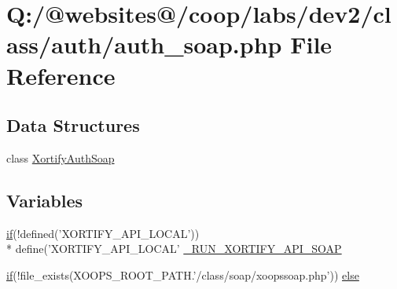 \hypertarget{auth__soap_8php}{\section{Q\-:/@websites@/coop/labs/dev2/class/auth/auth\-\_\-soap.php File Reference}
\label{auth__soap_8php}
}
\subsection*{Data Structures}
\begin{DoxyCompactItemize}
\item 
class \hyperlink{class_xortify_auth_soap}{Xortify\-Auth\-Soap}
\end{DoxyCompactItemize}
\subsection*{Variables}
\begin{DoxyCompactItemize}
\item 
\hyperlink{index_8php_ae2ccdf355624402b65fc2226f2a661cd}{if}(!defined('X\-O\-R\-T\-I\-F\-Y\-\_\-\-A\-P\-I\-\_\-\-L\-O\-C\-A\-L')) \\*
define('X\-O\-R\-T\-I\-F\-Y\-\_\-\-A\-P\-I\-\_\-\-L\-O\-C\-A\-L' \hyperlink{auth__soap_8php_a07583d496751dd9a708941cbd134b611}{\-\_\-\-R\-U\-N\-\_\-\-X\-O\-R\-T\-I\-F\-Y\-\_\-\-A\-P\-I\-\_\-\-S\-O\-A\-P}
\item 
\hyperlink{index_8php_ae2ccdf355624402b65fc2226f2a661cd}{if}(!file\-\_\-exists(X\-O\-O\-P\-S\-\_\-\-R\-O\-O\-T\-\_\-\-P\-A\-T\-H.'/class/soap/xoopssoap.\-php')) \hyperlink{auth__soap_8php_aa1dfe8b03eb0a67bfa60d8a6a976ff12}{else}
\end{DoxyCompactItemize}


